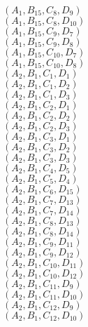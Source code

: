 \documentclass[14pt]{article}
\begin{document}
    $({A}_{1}, {B}_{15}, {C}_{8}, {D}_{9}) $ \\ 
    $({A}_{1}, {B}_{15}, {C}_{8}, {D}_{10}) $ \\ 
    $({A}_{1}, {B}_{15}, {C}_{9}, {D}_{7}) $ \\ 
    $({A}_{1}, {B}_{15}, {C}_{9}, {D}_{8}) $ \\ 
    $({A}_{1}, {B}_{15}, {C}_{10}, {D}_{7}) $ \\ 
    $({A}_{1}, {B}_{15}, {C}_{10}, {D}_{8}) $ \\ 
    $({A}_{2}, {B}_{1}, {C}_{1}, {D}_{1}) $ \\ 
    $({A}_{2}, {B}_{1}, {C}_{1}, {D}_{2}) $ \\ 
    $({A}_{2}, {B}_{1}, {C}_{1}, {D}_{3}) $ \\ 
    $({A}_{2}, {B}_{1}, {C}_{2}, {D}_{1}) $ \\ 
    $({A}_{2}, {B}_{1}, {C}_{2}, {D}_{2}) $ \\ 
    $({A}_{2}, {B}_{1}, {C}_{2}, {D}_{3}) $ \\ 
    $({A}_{2}, {B}_{1}, {C}_{3}, {D}_{1}) $ \\ 
    $({A}_{2}, {B}_{1}, {C}_{3}, {D}_{2}) $ \\ 
    $({A}_{2}, {B}_{1}, {C}_{3}, {D}_{3}) $ \\ 
    $({A}_{2}, {B}_{1}, {C}_{4}, {D}_{5}) $ \\ 
    $({A}_{2}, {B}_{1}, {C}_{5}, {D}_{4}) $ \\ 
    $({A}_{2}, {B}_{1}, {C}_{6}, {D}_{15}) $ \\ 
    $({A}_{2}, {B}_{1}, {C}_{7}, {D}_{13}) $ \\ 
    $({A}_{2}, {B}_{1}, {C}_{7}, {D}_{14}) $ \\ 
    $({A}_{2}, {B}_{1}, {C}_{8}, {D}_{13}) $ \\ 
    $({A}_{2}, {B}_{1}, {C}_{8}, {D}_{14}) $ \\ 
    $({A}_{2}, {B}_{1}, {C}_{9}, {D}_{11}) $ \\ 
    $({A}_{2}, {B}_{1}, {C}_{9}, {D}_{12}) $ \\ 
    $({A}_{2}, {B}_{1}, {C}_{10}, {D}_{11}) $ \\ 
    $({A}_{2}, {B}_{1}, {C}_{10}, {D}_{12}) $ \\ 
    $({A}_{2}, {B}_{1}, {C}_{11}, {D}_{9}) $ \\ 
    $({A}_{2}, {B}_{1}, {C}_{11}, {D}_{10}) $ \\ 
    $({A}_{2}, {B}_{1}, {C}_{12}, {D}_{9}) $ \\ 
    $({A}_{2}, {B}_{1}, {C}_{12}, {D}_{10}) $ \\ 
\end{document}
